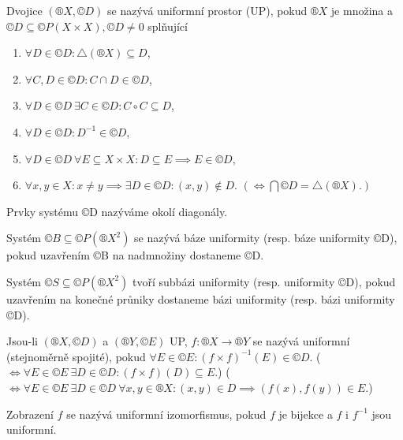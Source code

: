 \documentclass[12pt]{article}                   %
\begin{document}
    \begin{definice}
        Dvojice $(®X, ©D)$ se nazývá uniformní prostor (UP), pokud $®X$ je množina a $©D \subseteq ©P(X \times X), ©D ≠ 0$ splňující

        \begin{enumerate}
            \item $\forall D \in ©D: \triangle(®X) \subseteq D$,
            \item $\forall C, D \in ©D: C \cap D \in ©D$,
            \item $\forall D \in ©D\ \exists C \in ©D: C \circ C \subseteq D$,
            \item $\forall D \in ©D: D^{-1} \in ©D$,
            \item $\forall D \in ©D\ \forall E \subseteq X \times X: D \subseteq E \implies E \in ©D$,
            \item $\forall x, y \in X: x≠y \implies \exists D \in ©D: (x, y) \notin D$. $(\Leftrightarrow \bigcap ©D = \triangle(®X).)$
        \end{enumerate}

        Prvky systému ©D nazýváme okolí diagonály.
    \end{definice}

    \begin{definice}
        Systém $©B \subseteq ©P(®X^2)$ se nazývá báze uniformity (resp. báze uniformity ©D), pokud uzavřením ©B na nadmnožiny dostaneme ©D.
    \end{definice}

    \begin{definice}
        Systém $©S \subseteq ©P(®X^2)$ tvoří subbázi uniformity (resp. uniformity ©D), pokud uzavřením na konečné průniky dostaneme bázi uniformity (resp. bázi uniformity ©D).
    \end{definice}

    \begin{definice}
        Jsou-li $(®X, ©D)$ a $(®Y, ©E)$ UP, $f: ®X \rightarrow ®Y$ se nazývá uniformní (stejnoměrně spojité), pokud $\forall E \in ©E: (f \times f)^{-1}(E) \in ©D$. ($\Leftrightarrow \forall E \in ©E\ \exists D \in ©D: (f \times f)(D) \subseteq E$.) ($\Leftrightarrow \forall E \in ©E\ \exists D \in ©D\ \forall x, y \in ®X: (x, y) \in D \implies (f(x), f(y)) \in E$.)
    \end{definice}

    \begin{definice}
        Zobrazení $f$ se nazývá uniformní izomorfismus, pokud $f$ je bijekce a $f$ i $f^{-1}$ jsou uniformní.
    \end{definice}
\end{document}
